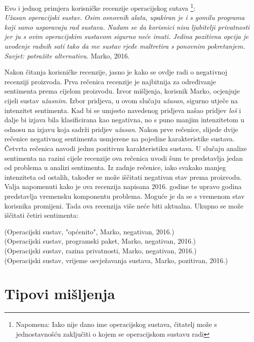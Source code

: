 \documentclass[times, utf8, zavrsni, numeric]{fer}
\begin{document}
\par Evo i jednog primjera korisničke recenzije operacijskog sutava
\footnote{Napomena: Iako nije dano ime operacijskog sustava, čitatelj može s jednostavnošću
zaključiti o kojem se operacijskom sustavu radi}: \\
{\it
Užasan operacijski sustav. 
Osim osnovnih alata, upakiran je i s gomilu programa koji samo usporavaju rad sustava.
Nadam se da korisnici nisu ljubitelji privatnosti jer ju s ovim operacijskim sustavom
sigurno neće imati. 
Jedina pozitivna opcija je uvođenje radnih sati tako da me sustav rjeđe maltretira s 
ponovnim pokretanjem.
Savjet: potražite alternativu.
} Marko, 2016.
\par Nakon čitanja korisničke recenzije, jasno je kako se ovdje radi o negativnoj recenziji
proizvoda.
Prva rečenica recenzije je najbitnija za određivanje sentimenta prema cijelom proizvodu.
Izvor mišljenja, korisnik Marko, ocjenjuje cijeli sustav \textit{užasnim}.
Izbor pridjeva, u ovom slučaju \textit{užasan}, sigurno utječe na intenzitet sentimenta. 
Kad bi se umjesto navedenog pridjeva našao pridjev \textit{loš} i dalje bi izjava bila
klasificirana kao negativna, no s puno manjim intenzitetom u odnosu na izjavu koja sadrži pridjev 
\textit{užasan}.
Nakon prve rečenice, slijede dvije rečenice negativnog sentimenta usmjerene na pojedine karakteristike
sustava. Četvrta rečenica navodi jednu pozitivnu karakteristiku sustava.
U slučaju analize sentimenta na razini cijele recenzije ova rečenica uvodi šum te predstavlja jedan od
problema u analizi sentimenta. 
Iz zadnje rečenice, iako svakako manjeg intenziteta od ostalih, također se može iščitati negativan 
stav prema proizvodu. Valja napomenuti kako je ova recenzija napisana 2016. godine te upravo godina 
predstavlja vremensku komponentu problema. Moguće je da se s vremenom stav korisnika promijeni.
Tada ova recenzija više neće biti aktualna. Ukupno se može iščitati četiri sentimenta: 
\begin{center}
(Operacijski sustav, "općenito", Marko, negativan, 2016.)\\
(Operacijski sustav, programski paket, Marko, negativan, 2016.)\\
(Operacijski sustav, razina privatnosti, Marko, negativan, 2016.)\\
(Operacijski sustav, vrijeme osvježavanja sustava, Marko, pozitivan, 2016.) \\
\end{center}

\section{Tipovi mišljenja} \label{samisljenje}
\end{document}
